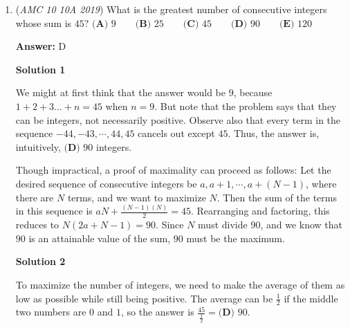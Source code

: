 \begin{enumerate}
 



\textbf{Solution 2 (cheese)}

After a thorough look through the answer choices we see that 75 and 76 are only one from each other, the MAA may have predicted that some people might silly this problem and pick 75 after seeing that it was an answer choice. Also accounting the fact that this is problem 4 you can relatively safely pick 76 immediately after seeing the answer choices.

 
Note: but, we would need to know that it's possible to silly and choose the answer choice of 75 after adding 14(3)+13+11+9=75 and forgetting to add 1. Thus, better to make the quick calculation rather than use a cheese.

 Education, The Study of Everything

 


	\item (\textit{AMC 10 10A 2019}) What is the greatest number of consecutive integers whose sum is $45?$
$\textbf{(A) } 9 \qquad\textbf{(B) } 25 \qquad\textbf{(C) } 45 \qquad\textbf{(D) } 90 \qquad\textbf{(E) } 120$

 \textbf{Answer: }D



\textbf{Solution 1}

We might at first think that the answer would be $9$, because $1+2+3 \dots +n = 45$ when $n = 9$. But note that the problem says that they can be integers, not necessarily positive. Observe also that every term in the sequence $-44, -43, \cdots, 44, 45$ cancels out except $45$.  Thus, the answer is, intuitively, $\boxed{\textbf{(D) } 90 }$ integers.

 Though impractical, a proof of maximality can proceed as follows:  Let the desired sequence of consecutive integers be $a, a+1, \cdots, a+(N-1)$, where there are $N$ terms, and we want to maximize $N$.  Then the sum of the terms in this sequence is $aN + \frac{(N-1)(N)}{2}=45$.  Rearranging and factoring, this reduces to $N(2a+N-1) = 90$.  Since $N$ must divide $90$, and we know that $90$ is an attainable value of the sum, $90$ must be the maximum.

 



\textbf{Solution 2}

To maximize the number of integers, we need to make the average of them as low as possible while still being positive. The average can be $\frac12$ if the middle two numbers are $0$ and $1$, so the answer is $\frac{45}{\frac12}=\boxed{\textbf{(D) } 90 }$.


\end{enumerate}
